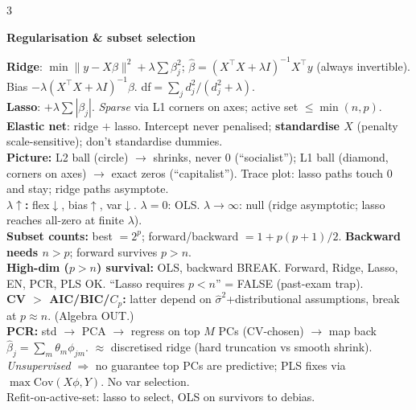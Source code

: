 \documentclass[a4paper,9pt]{extarticle}
\newcommand{\Cov}{\mathrm{Cov}}
\newcommand{\hd}[1]{\textbf{#1}}
\newcommand{\sect}[1]{\par\vspace{1pt}\noindent\colorbox{black!10}{\parbox{\dimexpr\linewidth-2\fboxsep\relax}{\strut\textbf{#1}\strut}}\par\vspace{1pt}}
\begin{document}
\begin{multicols*}{3}
\sect{Regularisation \& subset selection}
\hd{Ridge}: $\min\|y{-}X\beta\|^2+\lambda\sum\beta_j^2$; $\hat\beta=(X^\top X+\lambda I)^{-1}X^\top y$ (always invertible). Bias $-\lambda(X^\top X+\lambda I)^{-1}\beta$. df$=\sum_j d_j^2/(d_j^2{+}\lambda)$.\\
\hd{Lasso}: $+\lambda\sum|\beta_j|$. \emph{Sparse} via L1 corners on axes; active set $\le\min(n,p)$.\\
\hd{Elastic net}: ridge $+$ lasso. Intercept never penalised; \hd{standardise $X$} (penalty scale-sensitive); don't standardise dummies.\\
\hd{Picture:} L2 ball (circle) $\to$ shrinks, never 0 (``socialist''); L1 ball (diamond, corners on axes) $\to$ exact zeros (``capitalist''). Trace plot: lasso paths touch 0 and stay; ridge paths asymptote.\\
\hd{$\lambda\uparrow$:} flex$\downarrow$, bias$\uparrow$, var$\downarrow$. $\lambda{=}0$: OLS. $\lambda{\to}\infty$: null (ridge asymptotic; lasso reaches all-zero at finite $\lambda$).\\
\hd{Subset counts:} best $=2^p$; forward/backward $=1{+}p(p{+}1)/2$. \hd{Backward needs $n>p$}; forward survives $p>n$.\\
\hd{High-dim ($p>n$) survival:} OLS, backward BREAK. Forward, Ridge, Lasso, EN, PCR, PLS OK. ``Lasso requires $p<n$'' = FALSE (past-exam trap).\\
\hd{CV $>$ AIC/BIC/$C_p$:} latter depend on $\hat\sigma^2$+distributional assumptions, break at $p\!\approx\!n$. (Algebra OUT.)\\
\hd{PCR:} std $\to$ PCA $\to$ regress on top $M$ PCs (CV-chosen) $\to$ map back $\hat\beta_j=\sum_m\theta_m\phi_{jm}$. $\approx$ discretised ridge (hard truncation vs smooth shrink). \emph{Unsupervised} $\Rightarrow$ no guarantee top PCs are predictive; PLS fixes via $\max\Cov(X\phi,Y)$. No var selection.\\
Refit-on-active-set: lasso to select, OLS on survivors to debias.


\end{multicols*}
\end{document}
